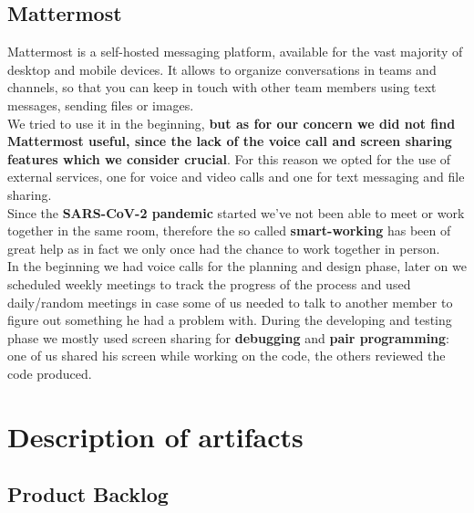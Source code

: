 \documentclass[a4paper,10pt]{report}
\begin{document}
\section[Mattermost] {Mattermost} 
Mattermost is a self-hosted messaging platform, available for the vast majority of desktop and mobile devices. It allows to organize conversations in teams and channels, so that you can keep in touch with other team members using text messages, sending files or images. \\
We tried to use it in the beginning, \textbf{but as for our concern we did not find Mattermost useful, since the lack of the voice call and screen sharing features which we consider crucial}. For this reason we opted for the use of external services, one for voice and video calls and one for text messaging and file sharing.\\
Since the \textbf{SARS-CoV-2 pandemic} started we've not been able to meet or work together in the same room, therefore the so called \textbf{smart-working} has been of great help as in fact we only once had the chance to work together in person. \\
In the beginning we had voice calls for the planning and design phase, later on we scheduled weekly meetings to track the progress of the process and used daily/random meetings in case some of us needed to talk to another member to figure out something he had a problem with.
During the developing and testing phase we mostly used screen sharing for \textbf{debugging} and \textbf{pair programming}: one of us shared his screen while working on the code, the others reviewed the code produced.
\chapter{Description of artifacts} %
%
\section{Product Backlog} %
\end{document}
